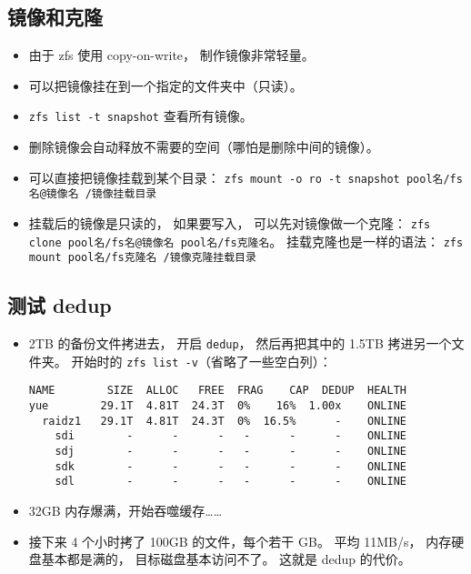 \subsection{镜像和克隆}
\begin{itemize}
\item 由于 zfs 使用 copy-on-write， 制作镜像非常轻量。
\item 可以把镜像挂在到一个指定的文件夹中（只读）。
\item \verb|zfs list -t snapshot| 查看所有镜像。
\item 删除镜像会自动释放不需要的空间（哪怕是删除中间的镜像）。
\item 可以直接把镜像挂载到某个目录： \verb|zfs mount -o ro -t snapshot pool名/fs名@镜像名 /镜像挂载目录|
\item 挂载后的镜像是只读的， 如果要写入， 可以先对镜像做一个克隆： \verb|zfs clone pool名/fs名@镜像名 pool名/fs克隆名|。 挂载克隆也是一样的语法： \verb|zfs mount pool名/fs克隆名 /镜像克隆挂载目录|
\end{itemize}

\subsection{测试 dedup}
\begin{itemize}
\item 2TB 的备份文件拷进去， 开启 \verb|dedup|， 然后再把其中的 1.5TB 拷进另一个文件夹。 开始时的 \verb|zfs list -v|（省略了一些空白列）：
\begin{lstlisting}[language=none]
NAME        SIZE  ALLOC   FREE  FRAG    CAP  DEDUP  HEALTH
yue        29.1T  4.81T  24.3T  0%    16%  1.00x    ONLINE
  raidz1   29.1T  4.81T  24.3T  0%  16.5%      -    ONLINE
    sdi        -      -      -   -      -      -    ONLINE
    sdj        -      -      -   -      -      -    ONLINE
    sdk        -      -      -   -      -      -    ONLINE
    sdl        -      -      -   -      -      -    ONLINE
\end{lstlisting}
\item 32GB 内存爆满，开始吞噬缓存……
\item 接下来 4 个小时拷了 100GB 的文件，每个若干 GB。 平均 11MB/s， 内存硬盘基本都是满的， 目标磁盘基本访问不了。 这就是 dedup 的代价。
\end{itemize}
